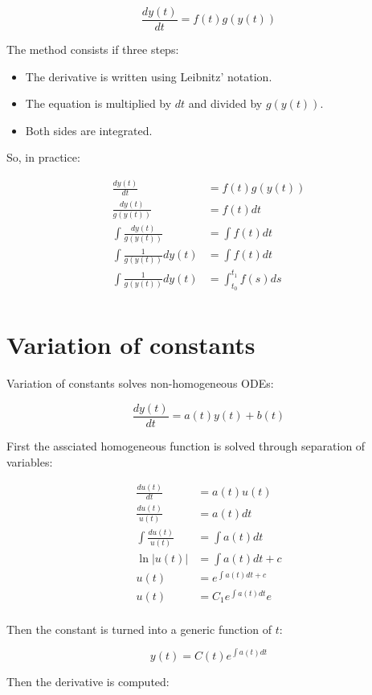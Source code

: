 $$\frac{dy(t)}{dt} = f(t)g(y(t))$$

The method consists if three steps:

\begin{multicols}{2}
	\begin{itemize}
		\item The derivative is written using Leibnitz' notation.
		\item The equation is multiplied by $dt$ and divided by $g(y(t))$.
		\item Both sides are integrated.
	\end{itemize}
\end{multicols}

So, in practice:

\begin{align*}
	\frac{dy(t)}{dt} &= f(t)g(y(t))\\
	\frac{dy(t)}{g(y(t))} &= f(t)dt\\
	\int\frac{dy(t)}{g(y(t))} &= \int f(t)dt\\
	\int\frac{1}{g(y(t))}dy(t) &= \int f(t)dt\\
	\int\frac{1}{g(y(t))}dy(t) &= \int_{t_0}^{t_1} f(s)ds\\
\end{align*}

\section{Variation of constants}
Variation of constants solves non-homogeneous ODEs:

$$\frac{dy(t)}{dt} = a(t)y(t) + b(t)$$

First the assciated homogeneous function is solved through separation of variables:

\begin{align*}
	\frac{du(t)}{dt} &= a(t)u(t)\\
	\frac{du(t)}{u(t)} &= a(t)dt\\
	\int\frac{du(t)}{u(t)} &= \int a(t)dt\\
	\ln|u(t)| &= \int a(t)dt + c\\
	u(t) &= e^{\int a(t)dt + c}\\
	u(t) &= C_1e^{\int a(t)dt}e\\
\end{align*}

Then the constant is turned into a generic function of $t$:

$$y(t) = C(t)e^{\int a(t)dt}$$

Then the derivative is computed:

